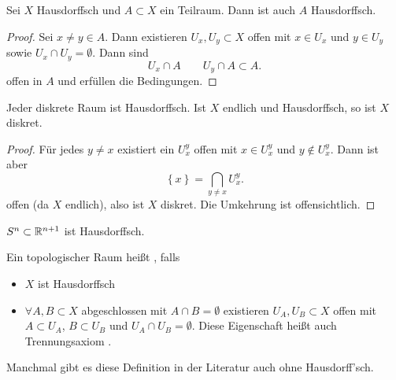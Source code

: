 \begin{lemma}\label{lm:teilraum-von-hausdorffraum-ist-hausdorff}
    Sei $X$ Hausdorffsch und $A\subset X$ ein Teilraum. Dann ist auch $A$ Hausdorffsch.
\end{lemma}
\begin{proof}
    Sei $x\neq y\in A$. Dann existieren $U_x, U_y\subset X$ offen mit $x\in U_x$ und $y\in U_y$ sowie $U_x \cap U_y = \emptyset$. Dann sind
    \[
    U_x \cap A \qquad U_y \cap A \subset A
    .\] 
    offen in $A$ und erfüllen die Bedingungen.
\end{proof}


\begin{remark}
    Jeder diskrete Raum ist Hausdorffsch. Ist $X$ endlich und Hausdorffsch, so ist  $X$ diskret.
\end{remark}
\begin{proof}
    Für jedes $y\neq x$ existiert ein $U_x^y$ offen mit  $x\in U_x^y$ und $y\not\in U_x^y$. Dann ist aber
    \[
    \left \{x\right\}  = \bigcap_{y\neq x} U_x^{y}
    .\] 
    offen (da $X$ endlich), also ist $X$ diskret. Die Umkehrung ist offensichtlich.
\end{proof}
\begin{example}
    $S^n \subset \mathbb{R}^{n+1}$ ist Hausdorffsch.
\end{example}

\begin{definition}[Normal]\label{def:normal}
    Ein topologischer Raum heißt , falls
    \begin{itemize}
        \item $X$ ist Hausdorffsch
        \item  $\forall A,B\subset X$ abgeschlossen mit $A \cap B = \emptyset$ existieren $U_A, U_B \subset X$ offen mit $A\subset U_A$, $B\subset U_B$ und $U_A \cap U_B = \emptyset$. Diese Eigenschaft heißt auch Trennungsaxiom . \\
            \begin{minipage}{\textwidth}
                \centering
                \begin{minipage}{0.3\textwidth}
                \end{minipage}
            \end{minipage}
    \end{itemize}
\end{definition}


\begin{remark}
    Manchmal gibt es diese Definition in der Literatur auch ohne Hausdorff'sch.
\end{remark}

